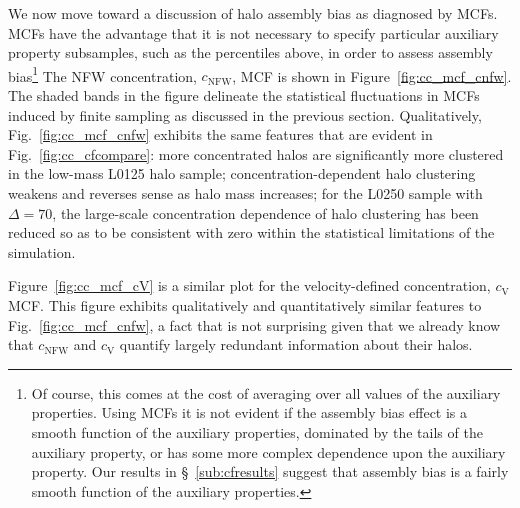 \documentclass[usenatbib,usegraphicx,letterpaper]{mn2e}
\begin{document}
We now move toward a discussion of halo assembly bias as diagnosed by MCFs. 
MCFs have the advantage that it is not necessary 
to specify particular auxiliary property subsamples, such as the percentiles above, 
in order to assess assembly bias\footnote{Of course, this comes at the cost of averaging 
over all values of the auxiliary properties. Using MCFs it is not evident if the assembly bias effect 
is a smooth function of the auxiliary properties, dominated by the tails of the auxiliary property, or 
has some more complex dependence upon the auxiliary property. Our results in \S~\ref{sub:cfresults} suggest 
that assembly bias is a fairly smooth function of the auxiliary properties.} 
The NFW concentration, $c_{\mathrm{NFW}}$, MCF is shown in Figure~\ref{fig:cc_mcf_cnfw}. 
The shaded bands in the figure delineate the statistical fluctuations in MCFs induced by 
finite sampling as discussed in the previous section. Qualitatively, 
Fig.~\ref{fig:cc_mcf_cnfw} exhibits the same features that are evident in 
Fig.~\ref{fig:cc_cfcompare}: more concentrated halos are significantly more clustered in 
the low-mass L0125 halo sample; concentration-dependent halo clustering weakens and 
reverses sense as halo mass increases; for the L0250 sample with $\Delta=70$, the large-scale 
concentration dependence of halo clustering has been reduced so as to be consistent with 
zero within the statistical limitations of the simulation. 

Figure~\ref{fig:cc_mcf_cV} is a similar plot for the velocity-defined concentration, $c_{\mathrm{V}}$ MCF. 
This figure exhibits qualitatively and quantitatively similar features to Fig.~\ref{fig:cc_mcf_cnfw}, a 
fact that is not surprising given that we already know that $c_{\mathrm{NFW}}$ and $c_{\mathrm{V}}$ 
quantify largely redundant information about their halos. 
\end{document}
